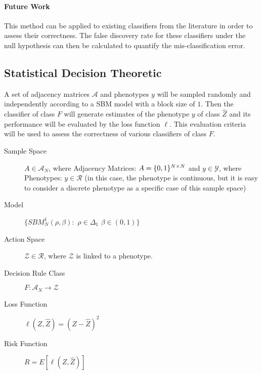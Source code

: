 \documentclass[12pt]{article}
\begin{document}
\paragraph{Future Work}
This method can be applied to existing classifiers from the literature in order to assess their correctness. The false discovery rate for these classifiers under the null hypothesis can then be calculated to quantify the mis-classification error.

\pagebreak
\subsection*{Statistical Decision Theoretic}
A set of adjacency matrices $\mathcal{A}$ and phenotypes $y$ will be sampled randomly and independently according to a SBM model with a block size of $1$. Then the classifier of class $F$ will generate estimates of the phenotype $y$ of class $\hat{Z}$ and its performance will be evaluated by the loss function $\ell$. This evaluation criteria will be used to assess the correctness of various classifiers of class $F$.

\begin{description}

\item[Sample Space] $A \in \mathcal{A}_N $, where 
 Adjacency Matrices: $A = \{0,1\}^{N \times N} \\ $ and $y \in \mathcal{Y}$, where
 Phenotypes: $y \in \mathcal{R}$ (in this case, the phenotype is continuous, but it is easy to consider a discrete phenotype as a specific case of this sample space)

\item[Model]
$  
\{SBM^{1}_N (\rho, \beta):$ 
$\rho \in \Delta_{1}$ 
$\beta \in (0,1) \}$

\item[Action Space]

$ \mathcal{Z} \in \mathcal{R}$, where 
$\mathcal{Z}$ is linked to a phenotype. 

\item[Decision Rule Class]
$ F: \mathcal{A}_N \to \mathcal{Z}$

\item[Loss Function]
$ \ell(Z, \hat{Z}) = ( Z - \hat{Z} )^2$



\item[Risk Function]
$  R = E[\ell(Z, \hat{Z})] $

\end{description}
\end{document}
